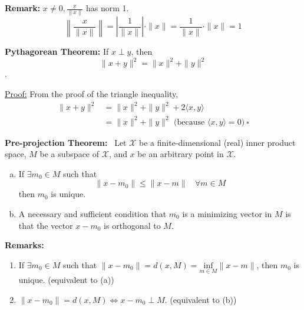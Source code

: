 \documentclass[letterpaper]{article}
\begin{document}
\textbf{Remark:} $x \neq 0, \frac{x}{\|x\|}$ has norm 1.
    $$\left \lVert \frac{x}{\|x\|}\right\rVert = \left| \frac{1}{\|x\|}\right| \cdot \|x\|=\frac{1}{\|x\|}\cdot \|x\|=1$$

\textbf{Pythagorean Theorem:} If $x \perp y$, then
    $$\|x+y\|^2 = \|x\|^2+ \|y\|^2$$.

\underline{Proof:} From the proof of the triangle inequality,
    \begin{align*}
        \|x+y\|^2 &= \|x\|^2+ \|y\|^2+2 \langle x,y \rangle  \\
        &= \|x\|^2+ \|y\|^2 \mbox{ (because $\langle x,y \rangle =0$)}\ \square
    \end{align*}

\textbf{Pre-projection Theorem:}~ Let $\mathcal{X}$ be a finite-dimensional (real) inner product space, $M$ be a subspace of $\mathcal{X}$, and $x$ be an arbitrary point in $\mathcal{X}$.
    \begin{enumerate}[(a)]
        \item If $\exists m_0 \in M $ such that $$\|x-m_0\| \leq \|x-m\| \ \ \ \ \forall m \in M$$then $m_0$ is unique.
        \item A necessary and sufficient condition that $m_0$ is a minimizing vector in $M$ is that the vector $x-m_0$ is orthogonal to $M$.
    \end{enumerate}

\textbf{Remarks:}
    \begin{enumerate}[(a')]
        \item If $\exists m_0 \in M$ such that $\|x-m_0\| = d(x,M) = \underset{m \in M}{\text{inf}} \|x-m\|$, then $m_0$ is unique. (equivalent to (a))
        \item $\|x-m_0\| = d(x,M) \Leftrightarrow x-m_0 \perp M$. (equivalent to (b))
    \end{enumerate}
\end{document}
